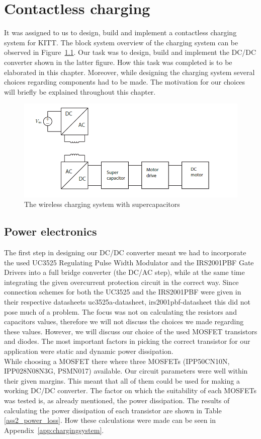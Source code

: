 \documentclass[11pt,titlepage]{report}
\begin{document}
\chapter{Contactless charging}
\label{ch:charging}
It was assigned to us to design, build and implement a contactless charging system for KITT. The block system overview of the charging system can be observed in Figure~\ref{fig:contactless_charging}. Our task was to design, build and implement the DC/DC converter shown in the latter figure. How this task was completed is to be elaborated in this chapter. Moreover, while designing the charging system several choices regarding components had to be made. The motivation for our choices will briefly be explained throughout this chapter. \\	

\begin{figure}[H]
	\begin{center}
		\includegraphics[width=0.8\linewidth]{resource/contactless_charging.png}
	\end{center}
	\caption{The wireless charging system with supercapacitors}
	\label{fig:contactless_charging}
\end{figure}


\section{Power electronics}
The first step in designing our DC/DC converter meant we had to incorporate the used UC3525 Regulating
Pulse Width Modulator and the IRS2001PBF Gate Drivers into a full bridge converter (the
DC/AC step), while at the same time integrating the given overcurrent protection circuit in the correct
way. Since connection schemes for both the UC3525 and the IRS2001PBF were given in their respective
datasheets uc3525a-datasheet, irs2001pbf-datasheet this did not pose much of a problem. The focus
was not on calculating the resistors and capacitors values, therefore we will not discuss the choices we
made regarding these values. However, we will discuss our choice of the used MOSFET transistors and
diodes. The most important factors in picking the correct transistor for our application were static and
dynamic power dissipation. \\
While choosing a MOSFET	there where three MOSFETs (IPP50CN10N, IPP028N08N3G, PSMN017) available. Our circuit parameters were well within their given margins. This meant that all of them could be used for making a working DC/DC converter. The factor on which the suitability of each MOSFETs was tested is, as already mentioned, the power dissipation. The results of calculating the power dissipation of each transistor are shown in Table \ref{ass2_power_loss}. How these calculations were made can be seen in Appendix~\ref{app:chargingsystem}. 
\end{document}
